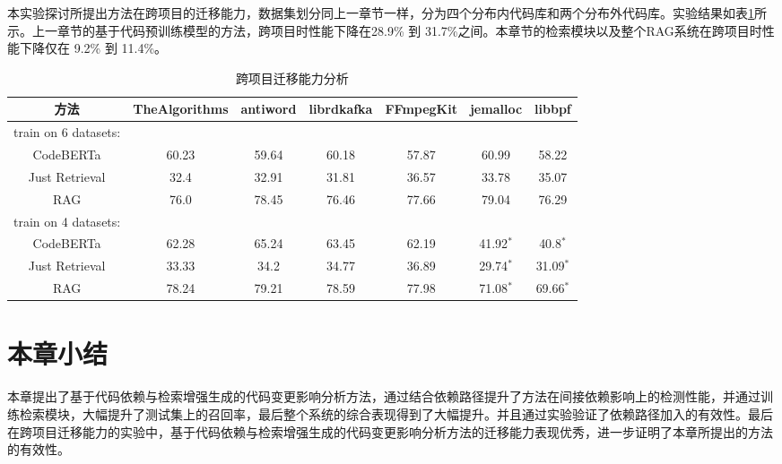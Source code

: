 本实验探讨所提出方法在跨项目的迁移能力，数据集划分同上一章节一样，分为四个分布内代码库和两个分布外代码库。实验结果如表\ref{2_跨项目迁移能力分析}所示。上一章节的基于代码预训练模型的方法，跨项目时性能下降在28.9\% 到 31.7\%之间。本章节的检索模块以及整个RAG系统在跨项目时性能下降仅在 9.2\% 到 11.4\%。


\begin{table}[htbp]
\caption{跨项目迁移能力分析}
\label{2_跨项目迁移能力分析}
\vspace{0.5em}\centering\wuhao
\begin{tabular}{c|cccc|cc}
\toprule
方法& TheAlgorithms & antiword & librdkafka & FFmpegKit & jemalloc & libbpf\\
\midrule
train on 6 datasets:\\
\midrule
CodeBERTa  &  60.23 & 59.64 & 60.18 & 57.87 & 60.99 & 58.22 \\
Just Retrieval   & 32.4 & 32.91 & 31.81 & 36.57 & 33.78 & 35.07  \\
RAG & 76.0 & 78.45 & 76.46 & 77.66 & 79.04 & 76.29  \\
\midrule
train on 4 datasets:\\
\midrule
CodeBERTa  &  62.28 & 65.24 & 63.45 & 62.19 & 41.92$^*$ & 40.8$^*$\\
Just Retrieval   & 33.33 & 34.2 & 34.77 & 36.89 & 29.74$^*$ & 31.09$^*$ \\
RAG & 78.24 & 79.21 & 78.59 & 77.98 & 71.08$^*$ & 69.66$^*$ \\
\bottomrule
\end{tabular}
\end{table}
 

\section{本章小结}

本章提出了基于代码依赖与检索增强生成的代码变更影响分析方法，通过结合依赖路径提升了方法在间接依赖影响上的检测性能，并通过训练检索模块，大幅提升了测试集上的召回率，最后整个系统的综合表现得到了大幅提升。并且通过实验验证了依赖路径加入的有效性。最后在跨项目迁移能力的实验中，基于代码依赖与检索增强生成的代码变更影响分析方法的迁移能力表现优秀，进一步证明了本章所提出的方法的有效性。

